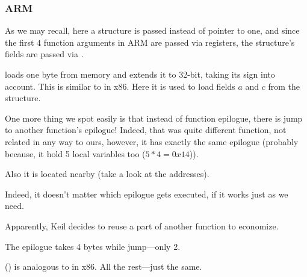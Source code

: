 \subsubsection{ARM}

\myparagraph{\OptimizingKeilVI (\ThumbMode)}



As we may recall, here a structure is passed instead of pointer to one,
and since the first 4 function arguments in ARM are passed via registers,
the structure's fields are passed via .

 loads one byte from memory and extends it to 32-bit, taking its sign into account.
This is similar to \MOVSX in x86.
Here it is used to load fields $a$ and $c$ from the structure.


One more thing we spot easily is that instead of function epilogue, there is jump to another function's epilogue!
Indeed, that was quite different function, not related in any way to ours, however, it has exactly
the same epilogue 
(probably because, it hold 5 local variables too 
($5*4=0x14$)).

Also it is located nearby (take a look at the addresses).

Indeed, it doesn't matter which epilogue gets executed,
if it works just as we need.

Apparently, Keil decides to reuse a part of another function to economize.

The epilogue takes 4 bytes while jump---only 2.




 () is analogous to \MOVSX in x86.
All the rest---just the same.

